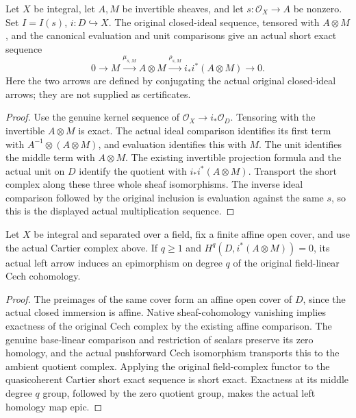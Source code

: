 \begin{lemma}
\label{lem:seshadri-actual-cartier-short-exact}
\leanok
Let $X$ be integral, let $A,M$ be invertible sheaves, and let
$s:\mathcal O_X\to A$ be nonzero. Set $I=I(s)$, $i:D\hookrightarrow X$.
The original closed-ideal sequence, tensored with $A\otimes M$, and the
canonical evaluation and unit comparisons give an actual short exact sequence
\[
0\longrightarrow M\xrightarrow{\mu_{s,M}} A\otimes M
\xrightarrow{\rho_{s,M}}i_*i^*(A\otimes M)\longrightarrow0.
\]
Here the two arrows are defined by conjugating the actual original
closed-ideal arrows; they are not supplied as certificates.
\end{lemma}
\begin{proof}
Use the genuine kernel sequence of
$\mathcal O_X\to i_*\mathcal O_D$. Tensoring with the invertible
$A\otimes M$ is exact. The actual ideal comparison identifies its first
term with $A^{-1}\otimes(A\otimes M)$, and evaluation identifies this
with $M$. The unit identifies the middle term with $A\otimes M$.
The existing invertible projection formula and the actual unit on $D$
identify the quotient with $i_*i^*(A\otimes M)$. Transport the short
complex along these three whole sheaf isomorphisms. The inverse ideal
comparison followed by the original inclusion is evaluation against the
same $s$, so this is the displayed actual multiplication sequence.
\end{proof}

\begin{lemma}
\label{lem:seshadri-one-cut-cohomology-epi}
\leanok
{}
Let $X$ be integral and separated over a field, fix a finite affine open
cover, and use the actual Cartier complex above. If $q\geq1$ and
$H^q(D,i^*(A\otimes M))=0$, its actual left arrow induces an epimorphism
on degree $q$ of the original field-linear Cech cohomology.
\end{lemma}
\begin{proof}
The preimages of the same cover form an affine open cover of $D$, since
the actual closed immersion is affine. Native sheaf-cohomology vanishing
implies exactness of the original Cech complex by the existing affine
comparison. The genuine base-linear comparison and restriction of scalars
preserve its zero homology, and the actual pushforward Cech isomorphism
transports this to the ambient quotient complex. Applying the original
field-complex functor to the quasicoherent Cartier short exact sequence
is short exact. Exactness at its middle degree $q$ group, followed by
the zero quotient group, makes the actual left homology map epic.
\end{proof}

